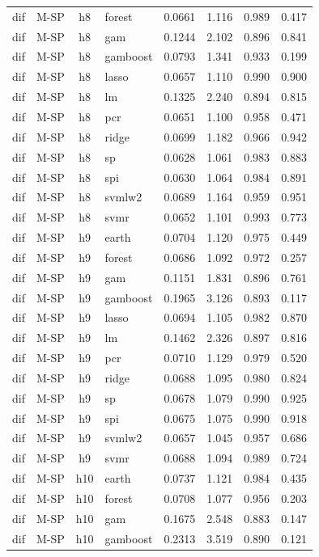 \begin{ThreePartTable}
\begin{longtable}[t]{llclcccc}
dif & M-SP & h8 & forest & 0.0661 & 1.116 & 0.989 & 0.417\\
dif & M-SP & h8 & gam & 0.1244 & 2.102 & 0.896 & 0.841\\
dif & M-SP & h8 & gamboost & 0.0793 & 1.341 & 0.933 & 0.199\\
dif & M-SP & h8 & lasso & 0.0657 & 1.110 & 0.990 & 0.900\\
dif & M-SP & h8 & lm & 0.1325 & 2.240 & 0.894 & 0.815\\
dif & M-SP & h8 & pcr & 0.0651 & 1.100 & 0.958 & 0.471\\
dif & M-SP & h8 & ridge & 0.0699 & 1.182 & 0.966 & 0.942\\
dif & M-SP & h8 & sp & 0.0628 & 1.061 & 0.983 & 0.883\\
dif & M-SP & h8 & spi & 0.0630 & 1.064 & 0.984 & 0.891\\
dif & M-SP & h8 & svmlw2 & 0.0689 & 1.164 & 0.959 & 0.951\\
dif & M-SP & h8 & svmr & 0.0652 & 1.101 & 0.993 & 0.773\\
\addlinespace
dif & M-SP & h9 & earth & 0.0704 & 1.120 & 0.975 & 0.449\\
dif & M-SP & h9 & forest & 0.0686 & 1.092 & 0.972 & 0.257\\
dif & M-SP & h9 & gam & 0.1151 & 1.831 & 0.896 & 0.761\\
dif & M-SP & h9 & gamboost & 0.1965 & 3.126 & 0.893 & 0.117\\
dif & M-SP & h9 & lasso & 0.0694 & 1.105 & 0.982 & 0.870\\
dif & M-SP & h9 & lm & 0.1462 & 2.326 & 0.897 & 0.816\\
dif & M-SP & h9 & pcr & 0.0710 & 1.129 & 0.979 & 0.520\\
dif & M-SP & h9 & ridge & 0.0688 & 1.095 & 0.980 & 0.824\\
dif & M-SP & h9 & sp & 0.0678 & 1.079 & 0.990 & 0.925\\
dif & M-SP & h9 & spi & 0.0675 & 1.075 & 0.990 & 0.918\\
dif & M-SP & h9 & svmlw2 & 0.0657 & 1.045 & 0.957 & 0.686\\
dif & M-SP & h9 & svmr & 0.0688 & 1.094 & 0.989 & 0.724\\
\addlinespace
dif & M-SP & h10 & earth & 0.0737 & 1.121 & 0.984 & 0.435\\
dif & M-SP & h10 & forest & 0.0708 & 1.077 & 0.956 & 0.203\\
dif & M-SP & h10 & gam & 0.1675 & 2.548 & 0.883 & 0.147\\
dif & M-SP & h10 & gamboost & 0.2313 & 3.519 & 0.890 & 0.121\\

\end{longtable}
\end{ThreePartTable}
